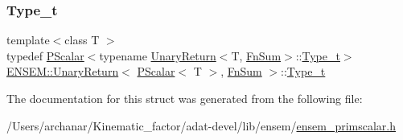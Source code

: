 \mbox{\label{structENSEM_1_1UnaryReturn_3_01PScalar_3_01T_01_4_00_01FnSum_01_4_abc54c8d313930663db099556679c774a}} 
\subsubsection{\texorpdfstring{Type\_t}{Type\_t}\hspace{0.1cm}{\footnotesize\ttfamily [3/3]}}
{\footnotesize\ttfamily template$<$class T $>$ \\
typedef \mbox{\hyperlink{classENSEM_1_1PScalar}{P\+Scalar}}$<$typename \mbox{\hyperlink{structENSEM_1_1UnaryReturn}{Unary\+Return}}$<$T, \mbox{\hyperlink{structENSEM_1_1FnSum}{Fn\+Sum}}$>$\+::\mbox{\hyperlink{structENSEM_1_1UnaryReturn_3_01PScalar_3_01T_01_4_00_01FnSum_01_4_abc54c8d313930663db099556679c774a}{Type\+\_\+t}}$>$ \mbox{\hyperlink{structENSEM_1_1UnaryReturn}{E\+N\+S\+E\+M\+::\+Unary\+Return}}$<$ \mbox{\hyperlink{classENSEM_1_1PScalar}{P\+Scalar}}$<$ T $>$, \mbox{\hyperlink{structENSEM_1_1FnSum}{Fn\+Sum}} $>$\+::\mbox{\hyperlink{structENSEM_1_1UnaryReturn_3_01PScalar_3_01T_01_4_00_01FnSum_01_4_abc54c8d313930663db099556679c774a}{Type\+\_\+t}}}



The documentation for this struct was generated from the following file\+:\begin{DoxyCompactItemize}
\item 
/\+Users/archanar/\+Kinematic\+\_\+factor/adat-\/devel/lib/ensem/\mbox{\hyperlink{adat-devel_2lib_2ensem_2ensem__primscalar_8h}{ensem\+\_\+primscalar.\+h}}\end{DoxyCompactItemize}
